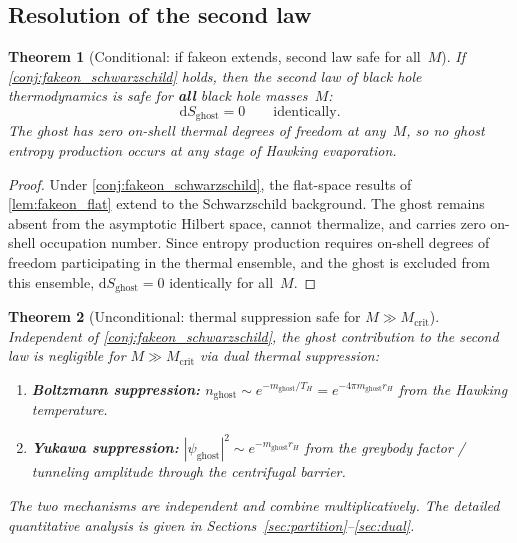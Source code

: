 \documentclass[11pt,a4paper]{article}
\newcommand{\dd}{\mathrm{d}}
\newcommand{\Mcrit}{M_{\mathrm{crit}}}
\newcommand{\mghost}{m_{\mathrm{ghost}}}
\newcommand{\Thr}{T_{\!\scriptscriptstyle H}}
\theoremstyle{plain}
\newtheorem{theorem}{Theorem}[section]
\theoremstyle{definition}
\begin{document}
\subsection{Resolution of the second law}%
\label{sec:fakeon_second_law}

\begin{theorem}[Conditional: if fakeon extends, second law safe for
  all~$M$]\label{thm:fakeon_second_law}
  If \cref{conj:fakeon_schwarzschild} holds, then the second law of
  black hole thermodynamics is safe for \textbf{all} black hole
  masses~$M$:
  \[
    \dd S_{\mathrm{ghost}} = 0 \qquad\text{identically.}
  \]
  The ghost has zero on-shell thermal degrees of freedom at any~$M$,
  so no ghost entropy production occurs at any stage of Hawking
  evaporation.
\end{theorem}

\begin{proof}
  Under \cref{conj:fakeon_schwarzschild}, the flat-space results of
  \cref{lem:fakeon_flat} extend to the Schwarzschild background.
  The ghost remains absent from the asymptotic Hilbert space, cannot
  thermalize, and carries zero on-shell occupation number.  Since
  entropy production requires on-shell degrees of freedom participating
  in the thermal ensemble, and the ghost is excluded from this
  ensemble, $\dd S_{\mathrm{ghost}} = 0$ identically for all~$M$.
\end{proof}

\begin{theorem}[Unconditional: thermal suppression safe for
  $M \gg \Mcrit$]\label{thm:thermal_second_law}
  Independent of \cref{conj:fakeon_schwarzschild}, the ghost
  contribution to the second law is negligible for $M \gg \Mcrit$
  via dual thermal suppression:
  \begin{enumerate}[label=\textup{(\alph*)}]
    \item \textbf{Boltzmann suppression:}
      $n_{\mathrm{ghost}} \sim e^{-\mghost/\Thr} =
       e^{-4\pi \mghost r_H}$ from the Hawking temperature.
    \item \textbf{Yukawa suppression:}
      $|\psi_{\mathrm{ghost}}|^2 \sim e^{-\mghost r_H}$ from the
      greybody factor / tunneling amplitude through the centrifugal
      barrier.
  \end{enumerate}
  The two mechanisms are independent and combine multiplicatively.
  The detailed quantitative analysis is given in
  Sections~\ref{sec:partition}--\ref{sec:dual}.
\end{theorem}
\end{document}

